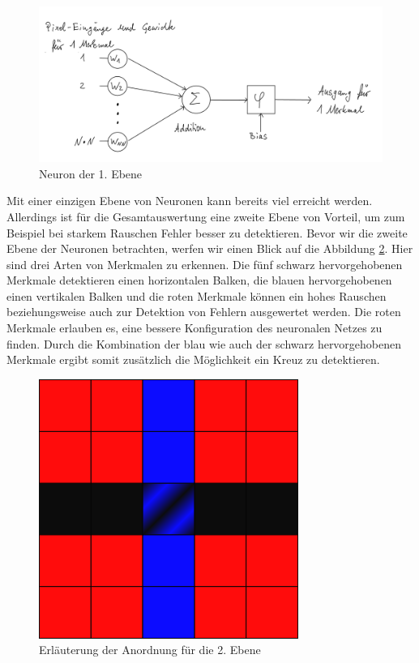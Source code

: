 \begin{figure}[hbt]
	\centering
	\includegraphics[width=0.8\linewidth]{./Bilder/Auswertung/Aufbau/page5}
	\caption{Neuron der 1. Ebene}
	\label{Neuron1Ebene}
\end{figure}

Mit einer einzigen Ebene von Neuronen kann bereits viel erreicht werden. Allerdings ist für die Gesamtauswertung eine zweite Ebene von Vorteil, um zum Beispiel bei starkem Rauschen Fehler besser zu detektieren. Bevor wir die zweite Ebene der Neuronen betrachten, werfen wir einen Blick auf die Abbildung \ref{Erl2Ebene}. Hier sind drei Arten von Merkmalen zu erkennen. Die fünf schwarz hervorgehobenen Merkmale detektieren einen horizontalen Balken, die blauen hervorgehobenen einen vertikalen Balken und die roten Merkmale können ein hohes Rauschen beziehungsweise auch zur Detektion von Fehlern ausgewertet werden. Die roten Merkmale erlauben es, eine bessere Konfiguration des neuronalen Netzes zu finden. Durch die Kombination der blau wie auch der schwarz hervorgehobenen Merkmale ergibt somit zusätzlich die Möglichkeit ein Kreuz zu detektieren.

\begin{figure}[hbt]
	\centering
	\includegraphics[width=0.5\linewidth]{./Bilder/Auswertung/Aufbau/Merkmal-Aufteilung}
	\caption{Erläuterung der Anordnung für die 2. Ebene}
	\label{Erl2Ebene}
\end{figure}

